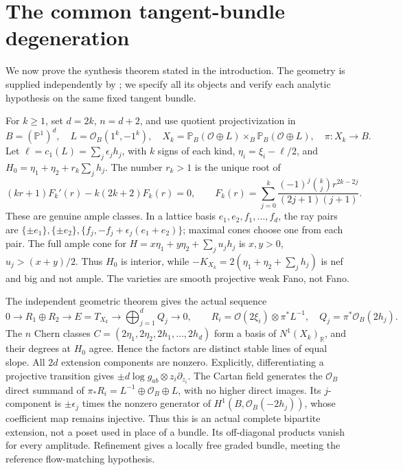 \documentclass[11pt]{amsart}
\theoremstyle{definition}
\theoremstyle{remark}
\newcommand{\RR}{\mathbb R}
\newcommand{\PP}{\mathbb P}
\newcommand{\cO}{\mathcal O}
\begin{document}
\section{The common tangent-bundle degeneration}\label{sec09:tangent}

We now prove the synthesis theorem stated in the introduction. The
geometry is supplied independently by \cite{wuebben2026realization};
we specify all its objects and verify each analytic hypothesis on the
same fixed tangent bundle.

For \(k\ge1\), set \(d=2k\), \(n=d+2\), and use quotient
projectivization in
\begin{equation}\label{eq09:family}
 B=(\PP^1)^d,\quad L=\cO_B(1^k,-1^k),\quad
 X_k=\PP_B(\cO\oplus L)\times_B\PP_B(\cO\oplus L),\quad
 \pi:X_k\to B.
\end{equation}
Let \(\ell=c_1(L)=\sum_j\epsilon_jh_j\), with \(k\) signs of
each kind, \(\eta_i=\xi_i-\ell/2\), and
\(H_0=\eta_1+\eta_2+r_k\sum_jh_j\). The number \(r_k>1\)
is the unique root of
\begin{equation}\label{eq09:root}
 (kr+1)F_k'(r)-k(2k+2)F_k(r)=0,\qquad
 F_k(r)=\sum_{j=0}^k
 \frac{(-1)^j\binom{k}{j}r^{2k-2j}}{(2j+1)(j+1)}.
\end{equation}
These are genuine ample classes. In a lattice basis
\(e_1,e_2,f_1,\ldots,f_d\), the ray pairs are
\(\{\pm e_1\},\{\pm e_2\},
\{f_j,-f_j+\epsilon_j(e_1+e_2)\}\); maximal cones choose one
from each pair. The full ample cone for
\(H=x\eta_1+y\eta_2+\sum_ju_jh_j\) is
\(x,y>0\), \(u_j>(x+y)/2\). Thus \(H_0\) is interior, while
\(-K_{X_k}=2(\eta_1+\eta_2+\sum_jh_j)\) is nef and big and
not ample. The varieties are smooth projective weak Fano, not Fano.

The independent geometric theorem
\cite[Theorem~1.1 and Propositions~7.1--7.2]{wuebben2026realization}
gives the actual sequence
\begin{equation}\label{eq09:tangent}
 0\longrightarrow R_1\oplus R_2\longrightarrow E=T_{X_k}
 \longrightarrow\bigoplus_{j=1}^dQ_j\longrightarrow0,\qquad
 R_i=\cO(2\xi_i)\otimes\pi^*L^{-1},\quad
 Q_j=\pi^*\cO_B(2h_j).
\end{equation}
The \(n\) Chern classes
\(C=(2\eta_1,2\eta_2,2h_1,\ldots,2h_d)\) form a basis of
\(N^1(X_k)_\RR\), and their degrees at \(H_0\) agree. Hence
the factors are distinct stable lines of equal slope.
All \(2d\) extension components are nonzero. Explicitly,
differentiating a projective transition gives
\(\pm d\log g_{ab}\otimes z_i\partial_{z_i}\).
The Cartan field generates the \(\cO_B\) direct summand of
\(\pi_*R_i=L^{-1}\oplus\cO_B\oplus L\), with no higher direct
images. Its \(j\)-component is \(\pm\epsilon_j\) times the
nonzero generator of \(H^1(B,\cO_B(-2h_j))\), whose coefficient
map remains injective. Thus this is an actual complete bipartite
extension, not a poset used in place of a bundle. Its off-diagonal
products vanish for every amplitude. Refinement gives a locally
free graded bundle, meeting the reference flow-matching hypothesis.
\end{document}

